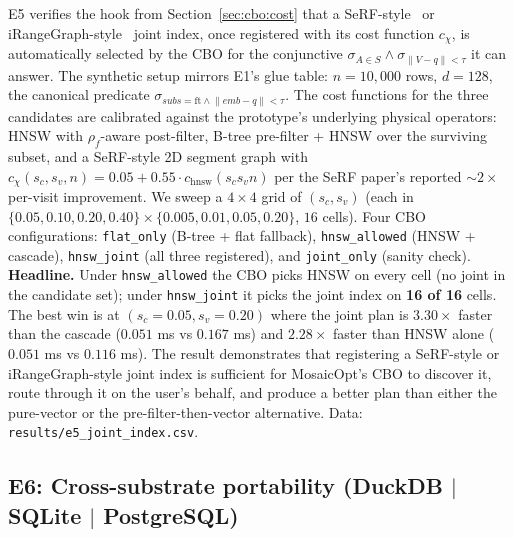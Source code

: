 \documentclass[sigconf]{acmart}
\theoremstyle{plain}
\theoremstyle{definition}
\theoremstyle{remark}
\begin{document}
E5 verifies the hook from Section~\ref{sec:cbo:cost} that a
SeRF-style~\cite{zuo2024serf} or
iRangeGraph-style~\cite{xu2025irangegraph} joint index, once
registered with its cost function $c_\chi$, is automatically
selected by the CBO for the conjunctive $\sigma_{A\in S} \wedge
\sigma_{\lVert V-q\rVert < \tau}$ it can answer. The synthetic
setup mirrors E1's glue table: $n = 10{,}000$ rows, $d = 128$,
the canonical predicate $\sigma_{\mathit{subs}=\mathrm{ft} \wedge
\lVert \mathit{emb} - q\rVert < \tau}$. The cost functions for
the three candidates are calibrated against the prototype's
underlying physical operators: HNSW with $\rho_f$-aware post-filter,
B-tree pre-filter + HNSW over the surviving subset, and a
SeRF-style 2D segment graph with $c_\chi(s_c, s_v, n) =
0.05 + 0.55 \cdot c_\mathrm{hnsw}(s_c s_v n)$ per the SeRF
paper's reported $\sim 2\times$ per-visit improvement. We sweep a
$4 \times 4$ grid of $(s_c, s_v)$ (each in $\{0.05, 0.10, 0.20,
0.40\} \times \{0.005, 0.01, 0.05, 0.20\}$, $16$ cells). Four CBO
configurations: \texttt{flat\_only} (B-tree + flat fallback),
\texttt{hnsw\_allowed} (HNSW + cascade), \texttt{hnsw\_joint}
(all three registered), and \texttt{joint\_only} (sanity check).
\textbf{Headline.} Under \texttt{hnsw\_allowed} the CBO picks
HNSW on every cell (no joint in the candidate set); under
\texttt{hnsw\_joint} it picks the joint index on \textbf{16 of
16} cells. The best win is at $(s_c = 0.05, s_v = 0.20)$ where the
joint plan is $\mathbf{3.30\times}$ faster than the cascade
($0.051$ ms vs $0.167$ ms) and $\mathbf{2.28\times}$ faster than
HNSW alone ($0.051$ ms vs $0.116$ ms). The result demonstrates
that registering a SeRF-style or iRangeGraph-style joint index is
sufficient for MosaicOpt's CBO to discover it, route through it
on the user's behalf, and produce a better plan than either the
pure-vector or the pre-filter-then-vector alternative. Data:
\texttt{results/e5\_joint\_index.csv}.

\subsection{E6: Cross-substrate portability (DuckDB $\mid$ SQLite $\mid$ PostgreSQL)}\label{sec:eval:e6}
\end{document}
